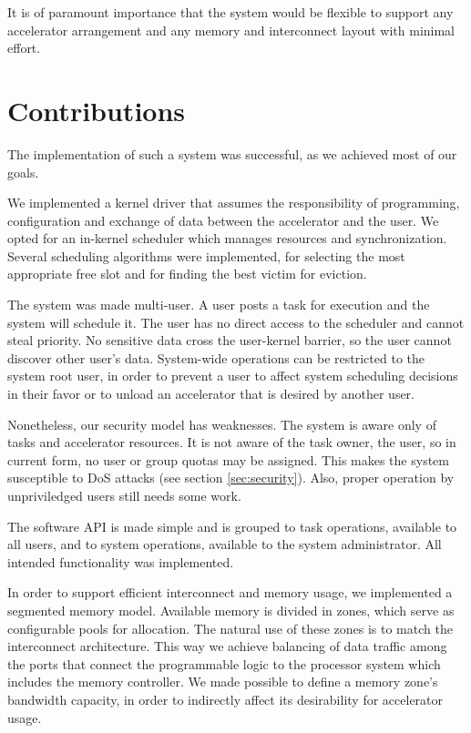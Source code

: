 It is of paramount importance that the system would be flexible to support any accelerator arrangement
and any memory and interconnect layout with minimal effort.

\section{Contributions}

The implementation of such a system was successful, as we achieved most of our goals.

We implemented a kernel driver that assumes the responsibility of programming, configuration
and exchange of data between the accelerator and the user. We opted for an in-kernel scheduler
which manages resources and synchronization. Several scheduling algorithms were implemented,
for selecting the most appropriate free slot and for finding the best victim for eviction.

The system was made multi-user. A user posts a task for execution and the system will schedule it.
The user has no direct access to the scheduler and cannot steal priority. No sensitive data
cross the user-kernel barrier, so the user cannot discover other user's data. 
System-wide operations can be restricted to the system root user, in order to prevent a user
to affect system scheduling decisions in their favor or to unload an accelerator that is desired by another user.

Nonetheless, our security model has weaknesses. The system is aware only of tasks and accelerator resources.
It is not aware of the task owner, the user, so in current form, no user or group quotas may be assigned.
This makes the system susceptible to DoS attacks (see section \ref{sec:security}).
Also, proper operation by unpriviledged users still needs some work.

The software API is made simple and is grouped to task operations, available to all users,
and to system operations, available to the system administrator. All intended functionality was implemented.

In order to support efficient interconnect and memory usage, we implemented a segmented memory model.
Available memory is divided in zones, which serve as configurable pools for allocation.
The natural use of these zones is to match the interconnect architecture.
This way we achieve balancing of data traffic among the ports that connect the programmable logic
to the processor system which includes the memory controller. 
We made possible to define a memory zone's bandwidth capacity, 
in order to indirectly affect its desirability for accelerator usage.

